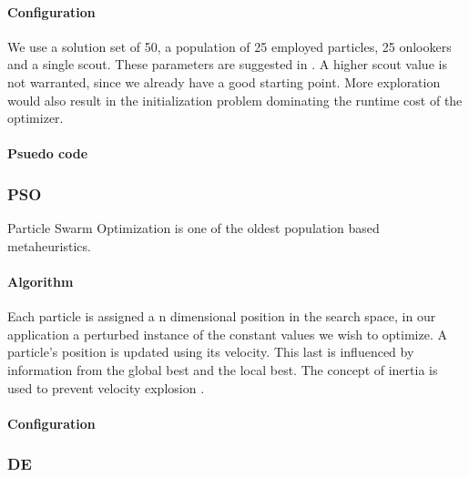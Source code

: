 \paragraph{Configuration}
We use a solution set of 50, a population of 25 employed particles, 25 onlookers and a single scout. These parameters are suggested in \citep{ABC}. A higher scout value is not warranted, since we already have a good starting point. More exploration would also result in the initialization problem dominating the runtime cost of the optimizer. 
\paragraph{Psuedo code}
\subsubsection{PSO}
Particle Swarm Optimization \cite{PSO} is one of the oldest population based metaheuristics. 
\paragraph{Algorithm}
Each particle is assigned a n dimensional position in the search space, in our application a perturbed instance of the constant values we wish to optimize. A particle's position is updated using its velocity. This last is influenced by information from the global best and the local best. The concept of inertia is used to prevent velocity explosion \cite{PSOExplosion}.
\paragraph{Configuration}
\subsubsection{DE}